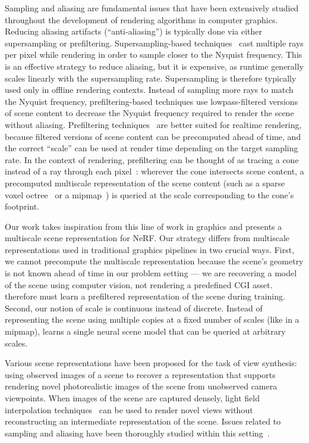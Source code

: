 \documentclass[10pt,twocolumn,letterpaper]{article}
\begin{document}
 Sampling and aliasing are fundamental issues that have been extensively studied throughout the development of rendering algorithms in computer graphics. Reducing aliasing artifacts (``anti-aliasing'') is typically done via either supersampling or prefiltering. Supersampling-based techniques~\cite{whitted80} cast multiple rays per pixel while rendering in order to sample closer to the Nyquist frequency. This is an effective strategy to reduce aliasing, but it is expensive, as runtime generally scales linearly with the supersampling rate. Supersampling is therefore typically used only in offline rendering contexts. Instead of sampling more rays to match the Nyquist frequency, prefiltering-based techniques use lowpass-filtered versions of scene content to decrease the Nyquist frequency required to render the scene without aliasing. Prefiltering techniques~\cite{Kaplanyan2016, Neumip, Olano, Lifan2019} are better suited for realtime rendering, because filtered versions of scene content can be precomputed ahead of time, and the correct ``scale'' can be used at render time depending on the target sampling rate. In the context of rendering, prefiltering can be thought of as tracing a cone instead of a ray through each pixel~\cite{amanatides1984ray,igehy1999}: wherever the cone intersects scene content, a precomputed multiscale representation of the scene content (such as a sparse voxel octree~\cite{Heitz2012,laine10} or a mipmap~\cite{williams83}) is queried at the scale corresponding to the cone's footprint. 

Our work takes inspiration from this line of work in graphics and presents a multiscale scene representation for NeRF. Our strategy differs from multiscale representations used in traditional graphics pipelines in two crucial ways. First, we cannot precompute the multiscale representation because the scene's geometry is not known ahead of time in our problem setting --- we are recovering a model of the scene using computer vision, not rendering a predefined CGI asset. 
\shortmodelname therefore must learn a prefiltered representation of the scene  during training.
Second, our notion of scale is continuous instead of discrete. Instead of representing the scene using multiple copies at a fixed number of scales (like in a mipmap), \shortmodelnamelower learns a single neural scene model that can be queried at arbitrary scales.

 Various scene representations have been proposed for the task of view synthesis: using observed images of a scene to recover a representation that supports rendering novel photorealistic images of the scene from unobserved camera viewpoints. When images of the scene are captured densely, light field interpolation techniques~\cite{davis12,gortler96,levoy96} can be used to render novel views without reconstructing an intermediate representation of the scene. Issues related to sampling and aliasing have been thoroughly studied within this setting~\cite{chai00}.
\end{document}
